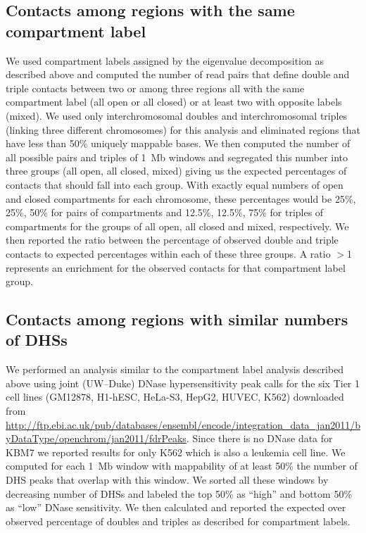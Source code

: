 \subsection*{Contacts among regions with the same compartment label}
We used compartment labels assigned by the eigenvalue decomposition as described
above and computed the number of read pairs that define double and triple contacts
between two or among three regions all with the same compartment label
(all open or all closed) or at least two with opposite labels (mixed). We used
only interchromosomal doubles and interchromosomal triples (linking three different chromosomes)
for this analysis and eliminated regions that have less than 50\% uniquely mappable bases.
We then computed the number of all possible pairs and triples
of 1~Mb windows and segregated this number into three groups (all open, all closed, mixed)
giving us the expected percentages of contacts that should fall into each group.
With exactly equal numbers of open and closed compartments for each chromosome,
these percentages would be 25\%, 25\%, 50\% for pairs of compartments and
12.5\%, 12.5\%, 75\%  for triples of compartments for the groups of all open,
all closed and mixed, respectively. We then reported the ratio between the percentage
of observed double and triple contacts to expected percentages within each of these
three groups. A ratio $>$1 represents an enrichment for the observed
contacts for that compartment label group.

\subsection*{Contacts among regions with similar numbers of DHSs}
We performed an analysis similar to the compartment label analysis described above
using joint (UW--Duke) DNase hypersensitivity peak calls for the six Tier 1 cell lines
(GM12878, H1-hESC, HeLa-S3, HepG2, HUVEC, K562)
downloaded from \url{http://ftp.ebi.ac.uk/pub/databases/ensembl/encode/integration_data_jan2011/byDataType/openchrom/jan2011/fdrPeaks}.
Since there is no DNase data for KBM7 we reported results for only K562
which is also a leukemia cell line. We computed for each 1~Mb window with
mappability of at least 50\% the number of DHS peaks that overlap with this
window. We sorted all these windows by decreasing number of DHSs
and labeled the top 50\% as ``high'' and bottom 50\% as ``low'' DNase
sensitivity. We then calculated and reported the expected over observed
percentage of doubles and triples as described for compartment labels.

